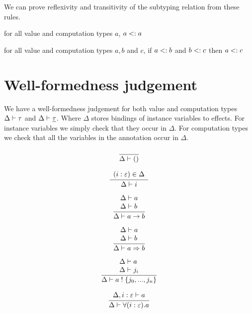 We can prove reflexivity and transitivity of the subtyping relation from these rules.
\begin{theorem}
for all value and computation types $a$, $a <: a$
\end{theorem}
\begin{theorem}
for all value and computation types $a, b$ and $c$, if $a <: b$ and $b <: c$ then $a <: c$
\end{theorem}

\newpage
\section{Well-formedness judgement}
We have a well-formedness judgement for both value and computation types $\Delta \vdash \tau$ and $\Delta \vdash \underline{\tau}$.
Where $\Delta$ stores bindings of instance variables to effects.
For instance variables we simply check that they occur in $\Delta$.
For computation types we check that all the variables in the annotation occur in $\Delta$.
\\

\begin{minipage}{0.25\textwidth}
\[\frac{
	\begin{array}{l}
	\end{array}
}{
	\Delta \vdash ()
}\]
\end{minipage}
\begin{minipage}{0.25\textwidth}
\[\frac{
	\begin{array}{l}
	(i : \varepsilon) \in \Delta \\
	\end{array}
}{
	\Delta \vdash i
}\]
\end{minipage}
\begin{minipage}{0.25\textwidth}
\[\frac{
	\begin{array}{l}
	\Delta \vdash a  \\
	\Delta \vdash b
	\end{array}
}{
	\Delta \vdash a \rightarrow b
}\]
\end{minipage}
\begin{minipage}{0.25\textwidth}
\[\frac{
	\begin{array}{l}
	\Delta \vdash a  \\
	\Delta \vdash b
	\end{array}
}{
	\Delta \vdash a \Rightarrow b
}\]
\end{minipage}
\begin{minipage}{0.5\textwidth}
\[\frac{
	\begin{array}{l}
	\Delta \vdash a  \\
	\Delta \vdash j_i
	\end{array}
}{
	\Delta \vdash a \; ! \; \{ j_0, ..., j_n \}
}\]
\end{minipage}
\begin{minipage}{0.5\textwidth}
\[\frac{
	\begin{array}{l}
	\Delta , i : \varepsilon \vdash a  \\
	\end{array}
}{
	\Delta \vdash \forall(i:\varepsilon) . a
}\]
\end{minipage}

